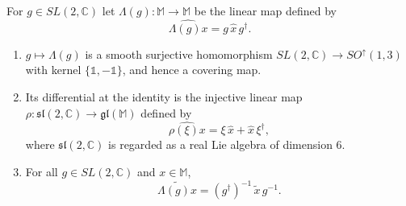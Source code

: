 \begin{lemma}\label{lem:sl2c-covering}
	For $g\in SL(2,\mathbb{C})$ let $\Lambda(g):\mathbb{M}\to\mathbb{M}$ be the linear map defined by
	\begin{equation}\label{eq:lorentz-action}
		\widehat{\Lambda(g)x}=g\,\hat{x}\,g^\dagger.
	\end{equation}
	\begin{enumerate}
		\item $g\mapsto\Lambda(g)$ is a smooth surjective homomorphism $SL(2,\mathbb{C})\to SO^\uparrow(1,3)$ with kernel $\{\mathbb{1},-\mathbb{1}\}$, and hence a covering map.
		\item Its differential at the identity is the injective linear map $\rho:\mathfrak{sl}(2,\mathbb{C})\to\mathfrak{gl}(\mathbb{M})$ defined by
		\begin{equation}\label{eq:rho}
			\widehat{\rho(\xi)x}=\xi\,\hat{x}+\hat{x}\,\xi^\dagger,
		\end{equation}
		where $\mathfrak{sl}(2,\mathbb{C})$ is regarded as a real Lie algebra of dimension $6$.
		\item For all $g\in SL(2,\mathbb{C})$ and $x\in\mathbb{M}$,
		\begin{equation}\label{eq:tilde-covariance}
			\widetilde{\Lambda(g)x}=(g^\dagger)^{-1}\,\tilde{x}\,g^{-1}.
		\end{equation}
	\end{enumerate}
\end{lemma}

